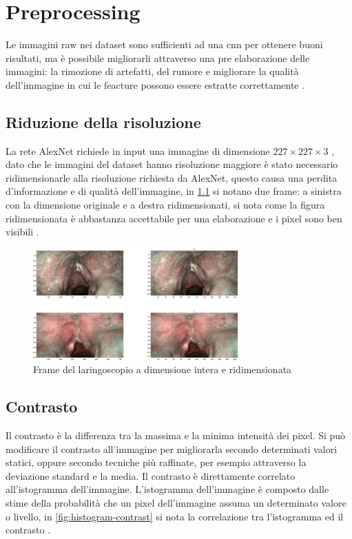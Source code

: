 \chapter{Preprocessing}\label{preprocessing}

Le immagini raw nei dataset sono sufficienti ad una \gls{cnn} per ottenere buoni risultati, ma è possibile migliorarli attraverso una pre elaborazione delle immagini: la rimozione di artefatti,  del rumore e migliorare la qualità dell'immagine 
in cui le feacture  possono essere estratte correttamente \cite{permual_contrast}.

\section{Riduzione della risoluzione}\label{riduzione-della-risoluzione}

La rete AlexNet richiede in input una immagine di dimensione \(227 \times 227 \times 3\) \cite{alexnet}, dato che le immagini del dataset hanno risoluzione maggiore è stato necessario ridimensionarle alla risoluzione richiesta da AlexNet, questo causa una perdita d'informazione e di qualità dell'immagine, in \cref{fig:resize} si notano due frame: a sinistra con la dimensione originale e a destra ridimensionati, si nota come la figura ridimensionata è abbastanza accettabile per una elaborazione e i pixel sono ben visibili \cite{gonzalez_dip}.

\begin{figure}[ht]
    \centering
    \includegraphics[width=0.7\textwidth]{preprocessing/resize.pdf}
    \caption{Frame del laringoscopio a dimensione intera e ridimensionata}
    \label{fig:resize}
\end{figure}

\section{Contrasto}\label{contrasto}

Il contrasto è la differenza tra la massima e la minima
intensità dei pixel. Si può modificare il contrasto all'immagine per migliorarla secondo determinati valori statici, oppure secondo tecniche più raffinate, per esempio attraverso la deviazione standard e la media. Il contrasto è direttamente correlato all'istogramma dell'immagine. L'istogramma dell'immagine è composto dalle stime della probabilità che un pixel dell'immagine assuma un determinato valore o livello, in \cref{fig:histogram-contrast} si nota la correlazione tra l'istogramma ed il contrasto \cite{permual_contrast}  \cite{hummel_histogram} \cite{pandey_contrast} \cite{gonzalez_dip}.

